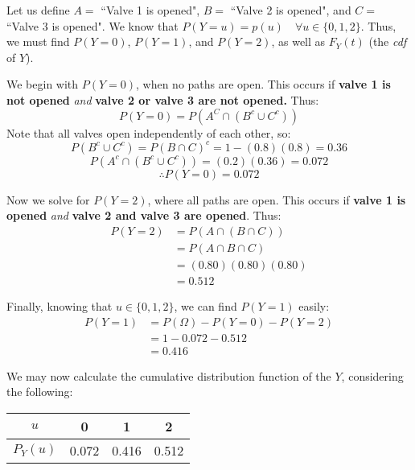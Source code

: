 \documentclass{article}
\begin{document}
	\begin{sol}
		Let us define $A=$ ``Valve 1 is opened", $B=$ ``Valve 2 is opened", and $C=$ ``Valve 3 is opened".  We know that $P(Y=u) = p(u) \quad \forall  u \in \{ 0,1,2 \}$.  Thus, we must find $P(Y=0)$, $P(Y=1)$, and $P(Y=2)$, as well as $F_Y (t)$ (the \emph{cdf} of $Y$). 
		
		We begin with $P(Y=0)$, when no paths are open. This occurs if \textbf{valve 1 is not opened} \emph{and} \textbf{valve 2 or valve 3 are not opened.} Thus:
		$$ P(Y=0) = P (A^C \cap (B^c \cup C^c))$$
		Note that all valves open independently of each other, so:
		$$ P(B^c \cup C^c) = P(B \cap C)^c = 1 - (0.8)(0.8) = 0.36$$
		$$ P(A^c \cap (B^c\cup C^c)) = (0.2)(0.36) = 0.072$$
		$$ \therefore P(Y=0) = 0.072 $$
		
		Now we solve for $P(Y=2)$, where all paths are open. This occurs if \textbf{valve 1 is opened} \emph{and} \textbf{valve 2 and valve 3 are opened}. Thus:
		\begin{align*}
			P(Y=2) &= P(A \cap (B \cap C))\\
			&= P(A \cap B \cap C)\\
			&= (0.80)(0.80)(0.80) \\
			&= 0.512
		\end{align*}
		
		Finally, knowing that $u \in \{0,1,2\}$, we can find $P(Y=1)$ easily:
		\begin{align*}
			P(Y=1) &= P(\Omega) - P(Y=0) - P(Y=2)\\ 
			&= 1 - 0.072 - 0.512 \\
			&= 0.416
		\end{align*}
		
		We may now calculate the cumulative distribution function of the $Y$, considering the following:
		\begin{table}[h]
			\begin{tabular}{|c|c|c|c|}
				\hline
				$u$	&	0	&	1	&	2 \\ \hline
				$P_Y(u)$ & 0.072 & 0.416 & 0.512 \\ \hline 
			\end{tabular}
		\end{table}
	

\end{sol}
\end{document}
